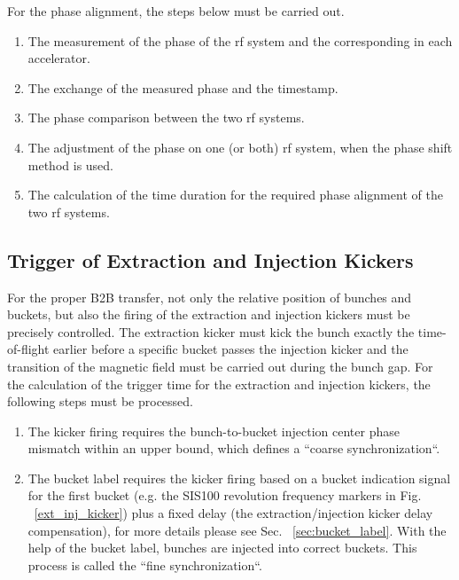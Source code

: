 For the phase alignment, the steps below must be carried out. 
\begin{enumerate}
\item The measurement of the phase of the rf system and the corresponding  in each accelerator.
\item The exchange of the measured phase and the timestamp.
\item The phase comparison between the two rf systems.
\item The adjustment of the phase on one (or both) rf system, when the phase shift method is used. 
\item The calculation of the time duration for the required phase alignment of the two rf systems.
\end{enumerate}

\subsection{Trigger of Extraction and Injection Kickers}
\label{sec:compensation}
For the proper B2B transfer, not only the relative position of bunches and buckets, but also the firing of the extraction and injection kickers must be precisely controlled. The extraction kicker must kick the bunch exactly the time-of-flight earlier before a specific bucket passes the injection kicker and the transition of the magnetic field must be carried out during the bunch gap. For the calculation of the trigger time for the extraction and injection kickers, the following steps must be processed. 
\begin{enumerate}
\item The kicker firing requires the bunch-to-bucket injection center phase mismatch within an upper bound, which defines a ``coarse synchronization``.
\item The bucket label requires the kicker firing based on a bucket indication signal for the first bucket (e.g. the SIS100 revolution frequency markers in Fig. ~\ref{ext_inj_kicker}) plus a
fixed delay (the extraction/injection kicker delay compensation), for more details please see Sec. ~\ref{sec:bucket_label}. With the help of the bucket label, bunches are injected into correct buckets. This process is called the ``fine synchronization``.
\end{enumerate}

